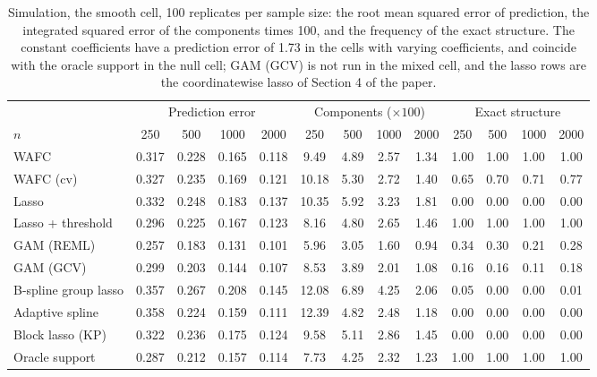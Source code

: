 \begin{table}[tp]
\caption{Simulation, the smooth cell, 100 replicates per sample size: the root mean squared error of prediction, the integrated squared error of the components times 100, and the frequency of the exact structure. The constant coefficients have a prediction error of 1.73 in the cells with varying coefficients, and coincide with the oracle support in the null cell; GAM (GCV) is not run in the mixed cell, and the lasso rows are the coordinatewise lasso of Section 4 of the paper.}
\label{tab:sim-sizes}
\centering
\footnotesize
\setlength{\tabcolsep}{3pt}
\begin{tabular}{l cccc cccc cccc}
\hline
 & \multicolumn{4}{c}{Prediction error} & \multicolumn{4}{c}{Components ($\times 100$)} & \multicolumn{4}{c}{Exact structure} \\
$n$ & 250 & 500 & 1000 & 2000 & 250 & 500 & 1000 & 2000 & 250 & 500 & 1000 & 2000 \\
\hline
WAFC & 0.317 & 0.228 & 0.165 & 0.118 & 9.49 & 4.89 & 2.57 & 1.34 & 1.00 & 1.00 & 1.00 & 1.00 \\
WAFC (cv) & 0.327 & 0.235 & 0.169 & 0.121 & 10.18 & 5.30 & 2.72 & 1.40 & 0.65 & 0.70 & 0.71 & 0.77 \\
Lasso & 0.332 & 0.248 & 0.183 & 0.137 & 10.35 & 5.92 & 3.23 & 1.81 & 0.00 & 0.00 & 0.00 & 0.00 \\
Lasso + threshold & 0.296 & 0.225 & 0.167 & 0.123 & 8.16 & 4.80 & 2.65 & 1.46 & 1.00 & 1.00 & 1.00 & 1.00 \\
GAM (REML) & 0.257 & 0.183 & 0.131 & 0.101 & 5.96 & 3.05 & 1.60 & 0.94 & 0.34 & 0.30 & 0.21 & 0.28 \\
GAM (GCV) & 0.299 & 0.203 & 0.144 & 0.107 & 8.53 & 3.89 & 2.01 & 1.08 & 0.16 & 0.16 & 0.11 & 0.18 \\
B-spline group lasso & 0.357 & 0.267 & 0.208 & 0.145 & 12.08 & 6.89 & 4.25 & 2.06 & 0.05 & 0.00 & 0.00 & 0.01 \\
Adaptive spline & 0.358 & 0.224 & 0.159 & 0.111 & 12.39 & 4.82 & 2.48 & 1.18 & 0.00 & 0.00 & 0.00 & 0.00 \\
Block lasso (KP) & 0.322 & 0.236 & 0.175 & 0.124 & 9.58 & 5.11 & 2.86 & 1.45 & 0.00 & 0.00 & 0.00 & 0.00 \\
Oracle support & 0.287 & 0.212 & 0.157 & 0.114 & 7.73 & 4.25 & 2.32 & 1.23 & 1.00 & 1.00 & 1.00 & 1.00 \\
\hline
\end{tabular}
\end{table}


